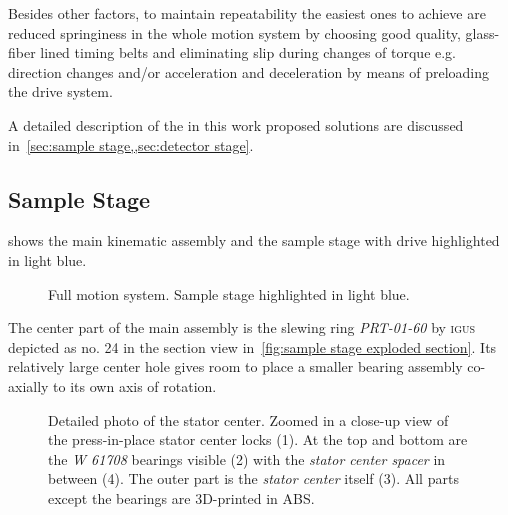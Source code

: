         Besides other factors, to maintain repeatability the easiest ones to achieve are reduced springiness in the whole motion system by choosing good quality, glass-fiber lined timing belts and eliminating slip during changes of torque e.g. direction changes and/or acceleration and deceleration by means of preloading the drive system.\par\medskip

        A detailed description of the in this work proposed solutions are discussed in~\cref{sec:sample stage,,sec:detector stage}.
        
        \subsection{Sample Stage}\label{sec:sample stage}
             shows the main kinematic assembly and the sample stage with drive highlighted in light blue.
            \begin{figure}[!ht]
                \centering
                \caption[Full motion system. Sample stage blue highlighted]{Full motion system. Sample stage highlighted in light blue.}%
                \label{fig:xmagix full sample highlightes}%
            \end{figure}%

            The center part of the main assembly is the slewing ring \textit{PRT-01-60} by \textsc{igus}~\cite{Manual.IglidePRTPolymerSlewingRings.} depicted as no. 24 in the section view in~\cref{fig:sample stage exploded section}.
            Its relatively large center hole gives room to place a smaller bearing assembly co-axially to its own axis of rotation.\par\medskip

            \begin{figure}[!h]
                \centering
                
                \caption[Detailed photo of the stator center]{Detailed photo of the stator center. Zoomed in a close-up view of the press-in-place stator center locks (1). At the top and bottom are the \textit{W 61708} bearings visible (2) with the \textit{stator center spacer} in between (4). The outer part is the \textit{stator center} itself (3). All parts except the bearings are 3D-printed in ABS.}%
                \label{fig:detailed view of the stator center}
            \end{figure}

